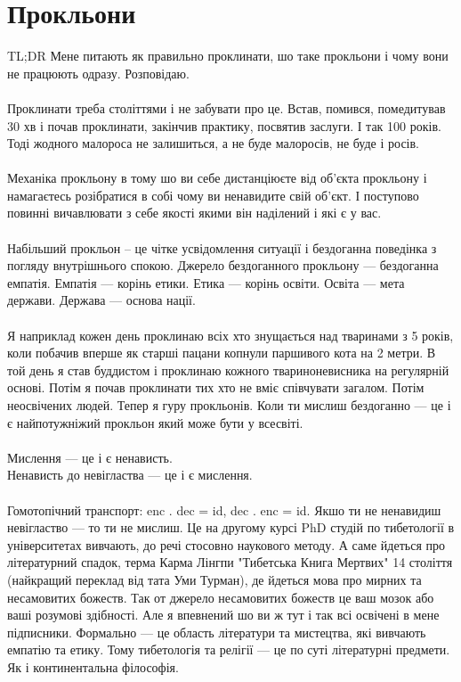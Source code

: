 \section{Прокльони}

TL;DR Мене питають як правильно проклинати, шо таке прокльони і чому вони не працюють одразу. Розповідаю.
\\
\\
Проклинати треба століттями і не забувати про це. Встав, помився, помедитував 30 хв і почав проклинати, закінчив практику, посвятив заслуги. І так 100 років. Тоді жодного малороса не залишиться, а не буде малоросів, не буде і росів.
\\
\\
Механіка прокльону в тому шо ви себе дистанціюєте від об'єкта прокльону і намагаєтесь розібратися в собі чому ви ненавидите свій об'єкт. І поступово повинні вичавлювати з себе якості якими він наділений і які є у вас.
\\
\\
Набільший прокльон -- це чітке усвідомлення ситуації і бездоганна поведінка з погляду внутрішнього спокою. Джерело бездоганного прокльону — бездоганна емпатія. Емпатія — корінь етики. Етика — корінь освіти. Освіта — мета держави. Держава — основа нації.
\\
\\
Я наприклад кожен день проклинаю всіх хто знущається над тваринами з 5 років, коли побачив вперше як старші пацани копнули паршивого кота на 2 метри. В той день я став буддистом і проклинаю кожного твариноневисника на регулярній основі. Потім я почав проклинати тих хто не вміє співчувати загалом. Потім неосвічених людей. Тепер я гуру прокльонів. Коли ти мислиш бездоганно — це і є найпотужніжий прокльон який може бути у всесвіті.
\\
\\
Мислення — це і є ненависть.\\
Ненависть до невігластва — це і є мислення.
\\
\\
Гомотопічний транспорт: enc . dec = id, dec . enc = id. Якшо ти не ненавидиш невігластво — то ти не мислиш. Це на другому курсі PhD студій по тибетології в університетах вивчають, до речі стосовно наукового методу. А саме йдеться про літературний спадок, терма Карма Лінгпи "Тибетська Книга Мертвих" 14 століття (найкращий переклад від тата Уми Турман), де йдеться мова про мирних та несамовитих божеств. Так от джерело несамовитих божеств це ваш мозок або ваші розумові здібності.
Але я впевнений шо ви ж тут і так всі освічені в мене підписники. Формально — це область літератури та мистецтва, які вивчають емпатію та етику. Тому тибетологія та релігії — це по суті літературні предмети. Як і континентальна філософія.
